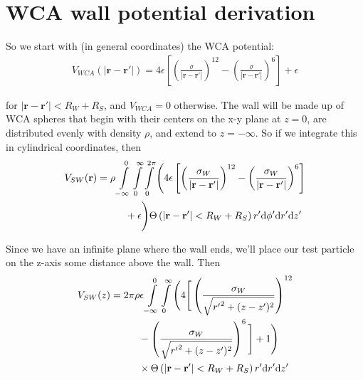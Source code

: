 \documentclass[letterpaper,twocolumn,amsmath,amssymb,prb]{revtex4-1}
\newcommand{\rr}{\textbf{r}}
\begin{document}
\section{WCA wall potential derivation}

So we start with (in general coordinates) the WCA potential:
\begin{align}
  V_{WCA}(|\rr - \rr'|) = 4\epsilon \left[ \left(\frac{\sigma}{|\rr - \rr'|}\right)^{12}
      - \left(\frac{\sigma}{|\rr - \rr'|}\right)^6\right] + \epsilon
\end{align}

for $|\rr - \rr'| < R_{W}+R_{S}$, and $V_{WCA} = 0$ otherwise. The wall will be
made up of WCA spheres that begin with their centers on the x-y plane
at $z = 0$, are distributed evenly with density $\rho$, and extend to $z
= -\infty$. So if we integrate this in cylindrical coordinates, then
\begin{align}
  V_{SW} (\rr) &= \rho \int\limits_{-\infty}^0 \int\limits_0^\infty
  \int\limits_0^{2\pi} \Bigg( 4\epsilon \left[
    \left(\frac{\sigma_W}{|\rr - \rr'|}\right)^{12} -
    \left(\frac{\sigma_W}{|\rr - \rr'|}\right)^6 \right] \notag \\
  & \hspace{1cm}+ \epsilon \Bigg) \Theta\left( |\rr-\rr'| <
  R_{W}+R_{S}\right) r'\textrm{d}\phi' \textrm{d}r' \textrm{d}z'
\end{align}

Since we have an infinite plane where the wall ends, we'll place our
test particle on the z-axis some distance above the wall. Then
\begin{align}
  V_{SW}(z) &= 2\pi\rho\epsilon \int\limits_{-\infty}^0
  \int\limits_0^\infty \Bigg( 4 \Bigg[
    \left(\frac{\sigma_W}{\sqrt{{r'}^2 + (z-z')^2}}\right)^{12} \notag
    \\
    &\hspace{1cm}-\left(\frac{\sigma_W}{\sqrt{{r'}^2 + (z-z')^2}}\right)^6 \Bigg]
  + 1 \Bigg) \notag \\
    &\hspace{1cm} \times \Theta\left( |\rr-\rr'| < R_{W}+R_{S}\right) r'\textrm{d}r' \textrm{d}z'
\end{align}
\end{document}
